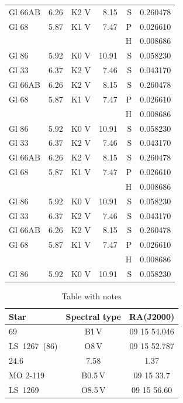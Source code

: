 \documentclass{aa}
\begin{document}
{\begin{landscape}
\begin{longtable}{lllrrr}
Gl 66AB  & 6.26 & K2 V & 8.15 & S & 0.260478\\
Gl 68    & 5.87 & K1 V & 7.47 & P & 0.026610\\
         &      &      &      & H & 0.008686\\
Gl 86    & 5.92 & K0 V & 10.91& S & 0.058230\\   Gl 33    & 6.37 & K2 V & 7.46 & S & 0.043170\\
Gl 66AB  & 6.26 & K2 V & 8.15 & S & 0.260478\\
Gl 68    & 5.87 & K1 V & 7.47 & P & 0.026610\\
         &      &      &      & H & 0.008686\\
Gl 86    & 5.92 & K0 V & 10.91& S & 0.058230\\   Gl 33    & 6.37 & K2 V & 7.46 & S & 0.043170\\
Gl 66AB  & 6.26 & K2 V & 8.15 & S & 0.260478\\
Gl 68    & 5.87 & K1 V & 7.47 & P & 0.026610\\
         &      &      &      & H & 0.008686\\
Gl 86    & 5.92 & K0 V & 10.91& S & 0.058230\\   Gl 33    & 6.37 & K2 V & 7.46 & S & 0.043170\\
Gl 66AB  & 6.26 & K2 V & 8.15 & S & 0.260478\\
Gl 68    & 5.87 & K1 V & 7.47 & P & 0.026610\\
         &      &      &      & H & 0.008686\\
Gl 86    & 5.92 & K0 V & 10.91& S & 0.058230\\   
\end{longtable}
\end{landscape}
}


\begin{table}[h!]
\caption{\label{t7}Table with notes}
\centering
\begin{tabular}{lcc}
\hline\hline
Star&Spectral type&RA(J2000)\\
\hline
69           &B1\,V     &09 15 54.046\\
LS~1267~(86) &O8\,V     &09 15 52.787\\
24.6         &7.58      &1.37\\
\hline
MO 2-119     &B0.5\,V   &09 15 33.7\\
LS~1269      &O8.5\,V   &09 15 56.60\\
\hline
\end{tabular}
\end{table}
\end{document}
